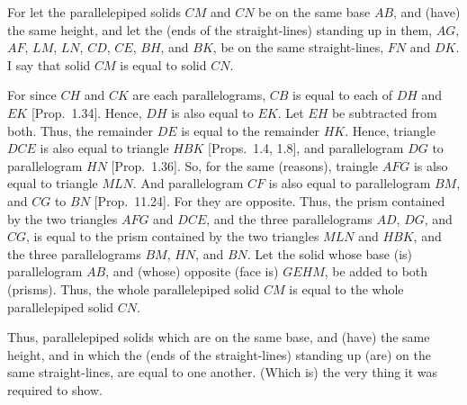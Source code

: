 \begin{Parallel}{}{}
{For let the parallelepiped solids $CM$ and $CN$ be on the same base $AB$,
and (have) the same height, and let the (ends of the straight-lines)
standing up in them, $AG$, $AF$, $LM$, $LN$, $CD$, $CE$, $BH$, and $BK$,
be  on the same straight-lines, $FN$ and $DK$. I say that  solid $CM$
is equal to solid $CN$.

For since $CH$ and $CK$ are each parallelograms, $CB$ is equal to each 
of $DH$ and $EK$ [Prop.~1.34]. Hence,
$DH$ is also equal to $EK$. Let $EH$ be subtracted from both.
Thus, the remainder $DE$ is equal to the remainder $HK$.
Hence, triangle $DCE$ is also equal to triangle $HBK$ [Props.~1.4, 1.8], and parallelogram $DG$ to parallelogram $HN$
[Prop.~1.36]. So, for the same (reasons), traingle
$AFG$ is also equal to triangle $MLN$. And parallelogram $CF$ is
also equal to parallelogram $BM$, and $CG$ to $BN$ [Prop.~11.24]. For they are opposite. Thus, the prism contained by the
two triangles $AFG$ and $DCE$, and the three parallelograms $AD$,
$DG$, and $CG$, is equal to the prism contained by the two triangles
$MLN$ and $HBK$, and the three parallelograms $BM$, $HN$, and
$BN$. Let the solid whose base (is) parallelogram $AB$, and
(whose) opposite (face is) $GEHM$, be added to both (prisms).
Thus, the whole parallelepiped solid $CM$ is equal to the whole parallelepiped solid $CN$.

Thus, parallelepiped solids which are on the same base,
and (have) the same height, and in which the (ends of the straight-lines) standing up (are) on the same straight-lines, 
are equal to one another. (Which is) the very thing it was required to show.}
\end{Parallel}

